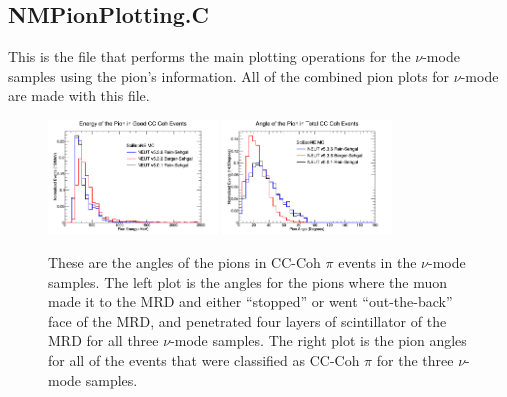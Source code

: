 \documentclass[11pt]{article}
\begin{document}
\subsection{NMPionPlotting.C}
\label{sub:NMPionPlotting.C}
This is the file that performs the main plotting operations for the $\nu$-mode samples using the pion's information. All of the combined pion plots for $\nu$-mode are made with this file.

\begin{figure}[H]
\centering
\includegraphics[width=0.4\textwidth]{NMPionPlottingImages/7-NMPionPlotting.png}
\includegraphics[width=0.4\textwidth]{NMPionPlottingImages/10-NMPionPlotting.png}
\caption{These are the angles of the pions in CC-Coh $\pi$ events in the $\nu$-mode samples. The left plot is the angles for the pions where the muon made it to the MRD and either ``stopped'' or went ``out-the-back'' face of the MRD, and penetrated four layers of scintillator of the MRD for all three $\nu$-mode samples. The right plot is the pion angles for all of the events that were classified as CC-Coh $\pi$ for the three $\nu$-mode samples.}
\label{fig:app:NMPionAng}
\end{figure}
\end{document}
